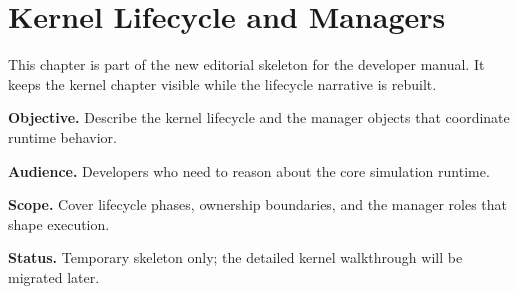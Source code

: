 \chapter{Kernel Lifecycle and Managers}
\label{chap:kernel-lifecycle-and-managers}

This chapter is part of the new editorial skeleton for the developer manual. It keeps the kernel chapter visible while the lifecycle narrative is rebuilt.

\noindent\textbf{Objective.} Describe the kernel lifecycle and the manager objects that coordinate runtime behavior.

\noindent\textbf{Audience.} Developers who need to reason about the core simulation runtime.

\noindent\textbf{Scope.} Cover lifecycle phases, ownership boundaries, and the manager roles that shape execution.

\noindent\textbf{Status.} Temporary skeleton only; the detailed kernel walkthrough will be migrated later.
